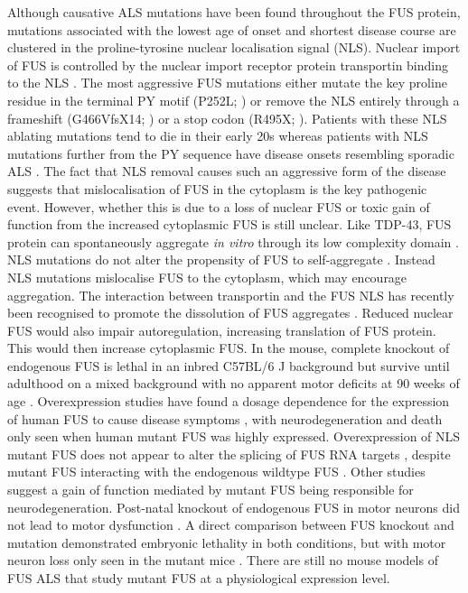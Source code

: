Although causative ALS mutations have been found throughout the FUS protein, mutations associated with the lowest age of onset and shortest disease course are clustered in the proline-tyrosine nuclear localisation signal (NLS). 
Nuclear import of FUS is controlled by the nuclear import receptor protein transportin binding to the NLS \citep{Dormann2010}.
The most aggressive FUS mutations either mutate the key proline residue in the terminal PY motif (P252L; \citealt{Chio2009}) or remove the NLS entirely through a frameshift (G466VfsX14; \citealt{DeJesus-Hernandez2010}) or a stop codon (R495X; \citealt{Bosco2010}). 
Patients with these NLS ablating mutations tend to die in their early 20s whereas patients with NLS mutations further from the PY sequence have disease onsets resembling sporadic ALS \citep{Shang2016}.
The fact that NLS removal causes such an aggressive form of the disease suggests that mislocalisation of FUS in the cytoplasm is the key pathogenic event. However, whether this is due to a loss of nuclear FUS or toxic gain of function from the increased cytoplasmic FUS is still unclear.
Like TDP-43, FUS protein can spontaneously aggregate \textit{in vitro} through its low complexity domain \citep{Murray2017}. 
NLS mutations do not alter the propensity of FUS to self-aggregate \citep{Sun2011}.
Instead NLS mutations mislocalise FUS to the cytoplasm, which may encourage aggregation. The interaction between transportin and the FUS NLS has recently been recognised to promote the dissolution of FUS aggregates \citep{Guo2018, Yoshizawa2018}. 
Reduced nuclear FUS would also impair autoregulation, increasing translation of FUS protein. This would then increase cytoplasmic FUS.
In the mouse, complete knockout of endogenous FUS is lethal in an inbred C57BL/6 J background  \citep{Hicks2000, Kuroda2000} but survive until adulthood on a mixed background with no apparent motor deficits at 90 weeks of age \citep{Kino2015}.
Overexpression studies have found a dosage dependence for the expression of human FUS to cause disease symptoms \citep{Verbeeck2012,Mitchell2013, Shiihashi2016}, with neurodegeneration and death only seen when human mutant FUS was highly expressed.
Overexpression of NLS mutant FUS does not appear to alter the splicing of FUS RNA targets \citep{Shiihashi2016}, despite mutant FUS interacting with the endogenous wildtype FUS \citep{Qiu2014}.
Other studies suggest a gain of function mediated by mutant FUS being responsible for neurodegeneration. 
Post-natal knockout of endogenous FUS  in motor neurons did not lead to motor dysfunction \citep{Sharma2016}.
A direct comparison between FUS knockout and mutation demonstrated embryonic lethality in both conditions, but with motor neuron loss only seen in the mutant mice \citep{Scekic-zahirovic2016}.  
There are still no mouse models of FUS ALS that study mutant FUS at a physiological expression level.



